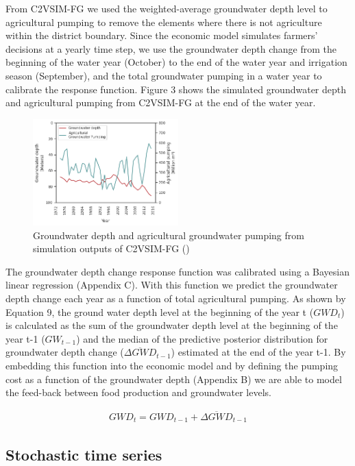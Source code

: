 \documentclass[11pt,a4paper]{article}
\begin{document}
From C2VSIM-FG we used the weighted-average groundwater depth level to agricultural pumping to remove the elements where there is not agriculture within the district boundary. Since the economic model simulates farmers’ decisions at a yearly time step, we use the groundwater depth change from the beginning of the water year (October) to the end of the water year and irrigation season (September), and the total groundwater pumping in a water year to calibrate the response function. Figure 3 shows the simulated groundwater depth and agricultural pumping from C2VSIM-FG at the end of the water year. 

\begin{figure}[H]
    \centering
    \includegraphics[width=0.5\textwidth]{c2vsim_semitropic.png}
    \caption{Groundwater depth and agricultural groundwater pumping from simulation outputs of C2VSIM-FG (\cite{dwr_c2vsimfg_2021})}
    \label{fig:mes1h1}
\end{figure}

The groundwater depth change response function was calibrated using a Bayesian linear regression (Appendix C). With this function we predict the groundwater depth change each year as a function of total agricultural pumping. As shown by Equation 9, the ground water depth level at the beginning of the year t ($GWD_{t}$) is calculated as the sum of the groundwater depth level at the beginning of the year t-1 ($GW_{t-1}$)  and the median of the predictive posterior distribution for groundwater depth change ($\overline{\Delta GWD}_{t-1}$) estimated at the end of the year t-1. By embedding this function into the economic model and by defining the pumping cost as a function of the groundwater depth (Appendix B) we are able to model the feed-back between food production and groundwater levels. 

\begin{align}
GWD_{t} = GWD_{t-1} + \overline{\Delta GWD}_{t-1}
\end{align}

\subsection{Stochastic time series}
\end{document}
